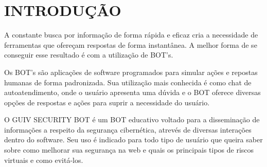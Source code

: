 \chapter{\uppercase{Introdução}}
\label{introducao}


A constante busca por informação de forma rápida e eficaz cria a necessidade de ferramentas que ofereçam respostas de forma instantânea. A melhor forma de se conseguir esse resultado é com a utilização de BOT's.

Os BOT's são aplicações de software programados para simular ações e repostas humanas de forma padronizada. Sua utilização mais conhecida é como chat de autoatendimento, onde o usuário apresenta uma dúvida e o BOT oferece diversas opções de respostas e ações para suprir a necessidade do usuário. \cite{bots}

O GUIV SECURITY BOT é um BOT educativo voltado para a disseminação de informações a respeito da segurança cibernética, atrevés de diversas interações dentro do software. Seu uso é indicado para todo tipo de usuário que queira saber sobre como melhorar sua segurança na web e quais os principais tipos de riscos virtuais e como evitá-los.\cite{malware}


